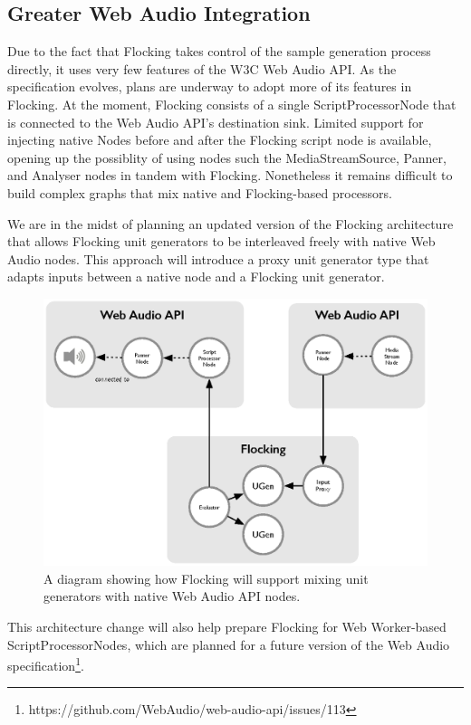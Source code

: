 \documentclass{article}
\begin{document}
\subsection{Greater Web Audio Integration}

Due to the fact that Flocking takes control of the sample generation process directly, it uses very few features of the W3C Web Audio API. As the specification evolves, plans are underway to adopt more of its features in Flocking. At the moment, Flocking consists of a single ScriptProcessorNode that is connected to the Web Audio API's destination sink. Limited support for injecting native Nodes before and after the Flocking script node is available, opening up the possiblity of using nodes such the MediaStreamSource, Panner, and Analyser nodes in tandem with Flocking. Nonetheless it remains difficult to build complex graphs that mix native and Flocking-based processors.

We are in the midst of planning an updated version of the Flocking architecture that allows Flocking unit generators to be interleaved freely with native Web Audio nodes. This approach will introduce a proxy unit generator type that adapts inputs between a native node and a Flocking unit generator.

\begin{figure}[ht]
\centering
\includegraphics[width=0.9\columnwidth]{images/flocking-web-audio-islands.eps}
\caption{ A diagram showing how Flocking will support mixing unit generators with native Web Audio API nodes.\label{fig:webaudioflocking}}
\end{figure}

This architecture change will also help prepare Flocking for Web Worker-based ScriptProcessorNodes, which are planned for a future version of the Web Audio specification\footnote{https://github.com/WebAudio/web-audio-api/issues/113}.
\end{document}
